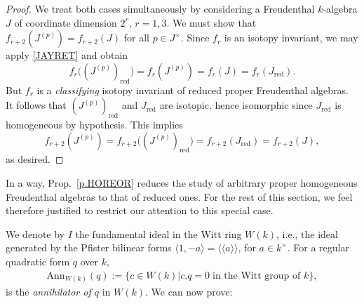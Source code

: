 \documentclass{amsart}
\def\lz{\par \vspace{8pt}}
\newtheorem{prop}[equation]{Proposition}
\theoremstyle{definition} %
\theoremstyle{remark} %
\DeclareMathOperator{\diag}{diag}
\DeclareMathOperator{\red}{red}
\newcommand{\dla}{\langle\langle}
\newcommand{\dra}{\rangle\rangle}
\renewcommand{\:}{\colon\,}
\DeclareMathOperator{\Her}{Her}
\numberwithin{equation}{section}
\begin{document}
\begin{proof}
We treat both cases simultaneously by considering a Freudenthal $k$-algebra $J$ of coordinate dimension $2^r$, $r = 1,3$. We must show that $f_{r+2}(J^{(p)}) = f_{r+2}(J)$ for all $p \in J^\times$. Since $f_r$ is an isotopy invariant, we may apply \eqref{JAYRET} and obtain
\[
f_r\big((J^{(p)})_{\red}\big) = f_r(J^{(p)}) =f_r(J) = f_r(J_{\red}).
\]
But $f_r$ is a \emph{classifying} isotopy invariant of reduced proper Freudenthal algebras. It follows that $(J^{(p)})_{\red}$ and $J_{\red}$ are isotopic, hence isomorphic since $J_{\red}$ is homogeneous by hypothesis. This implies 
\[
f_{r+2}(J^{(p)}) = f_{r+2}\big((J^{(p)})_{\red}\big) = f_{r+2}(J_{\red}) = f_{r+2}(J),
\]
as desired.
\end{proof}
\lz

\noindent In a way, Prop.~\ref{p.HOREOR} reduces the study of arbitrary proper homogeneous Freudenthal algebras to that of reduced ones. For the rest of this section, we feel therefore justified to restrict our attention to this special case. \lz

\noindent We denote by $I$ the fundamental ideal in the Witt ring $W(k)$, i.e., the ideal generated by the Pfister bilinear forms $\langle 1, -a \rangle = \dla a\dra$, for $a\in k^\times$. For a regular quadratic form $q$ over $k$, 
\begin{align*}
\mathrm{Ann}_{W(k)}(q):=\{c\in W(k)|c.q = 0\;\text{in the Witt group of $k$}\},    
\end{align*}
is the \emph{annihilator of $q$} in $W(k)$. We can now prove:  
 
\end{document}
